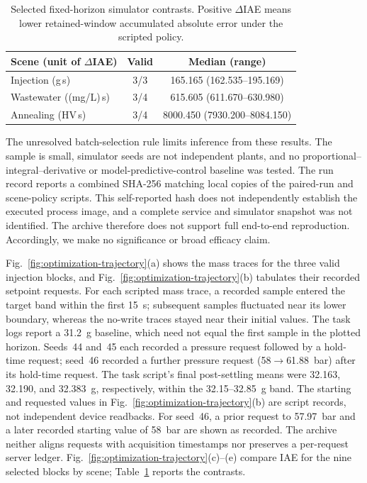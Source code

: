 \begin{table}[!t]
\centering
\caption{Selected fixed-horizon simulator contrasts. Positive $\Delta$IAE means lower retained-window accumulated absolute error under the scripted policy.}
\label{tab:selected-iae}
\footnotesize
\setlength{\tabcolsep}{3pt}
\begin{tabular}{@{}lcc@{}}
\toprule
Scene (unit of $\Delta$IAE) & Valid & Median (range) \\
\midrule
Injection (g\,s) & 3/3 & 165.165 (162.535--195.169) \\
Wastewater ((mg/L)\,s) & 3/4 & 615.605 (611.670--630.980) \\
Annealing (HV\,s) & 3/4 & 8000.450 (7930.200--8084.150) \\
\bottomrule
\end{tabular}
\end{table}

The unresolved batch-selection rule limits inference from these results. The sample is small, simulator seeds are not independent plants, and no proportional--integral--derivative or model-predictive-control baseline was tested. The run record reports a combined SHA-256 matching local copies of the paired-run and scene-policy scripts. This self-reported hash does not independently establish the executed process image, and a complete service and simulator snapshot was not identified. The archive therefore does not support full end-to-end reproduction. Accordingly, we make no significance or broad efficacy claim.

Fig.~\ref{fig:optimization-trajectory}(a) shows the mass traces for the three valid injection blocks, and Fig.~\ref{fig:optimization-trajectory}(b) tabulates their recorded setpoint requests. For each scripted mass trace, a recorded sample entered the target band within the first 15~s; subsequent samples fluctuated near its lower boundary, whereas the no-write traces stayed near their initial values. The task logs report a 31.2~g baseline, which need not equal the first sample in the plotted horizon. Seeds~44 and~45 each recorded a pressure request followed by a hold-time request; seed~46 recorded a further pressure request (58$\rightarrow$61.88~bar) after its hold-time request. The task script's final post-settling means were 32.163, 32.190, and 32.383~g, respectively, within the 32.15--32.85~g band. The starting and requested values in Fig.~\ref{fig:optimization-trajectory}(b) are script records, not independent device readbacks. For seed~46, a prior request to 57.97~bar and a later recorded starting value of 58~bar are shown as recorded. The archive neither aligns requests with acquisition timestamps nor preserves a per-request server ledger. Fig.~\ref{fig:optimization-trajectory}(c)--(e) compare IAE for the nine selected blocks by scene; Table~\ref{tab:selected-iae} reports the contrasts.

